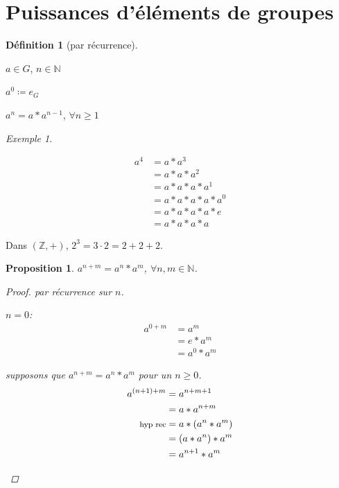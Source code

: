 \documentclass{report}
\newcommand*{\gte}{\geqslant}
\newcommand*{\entiers}{\mathbb{Z}}
\newcommand*{\naturels}{\mathbb{N}}
\newtheorem*{prop}{Proposition}
\theoremstyle{definition}
\newtheorem*{defin}{D\'efinition}
\theoremstyle{remark}
\newtheorem*{exem}{Exemple}
\begin{document}
	\section*{Puissances d'\'el\'ements de groupes}
	\begin{defin}[par r\'ecurrence]~

		$a \in G$, $n \in \naturels$
		\begin{nlist}
			\item $a^0 \coloneq e_G$
			\item $a^n=a*a^{n-1}$, $\forall n \gte 1$
		\end{nlist}
	\end{defin}
	\begin{exem}~

		\begin{ulist}
			\item \begin{align*}
				a^4&= a*a^3\\
				&= a*a*a^2\\
				&= a*a*a*a^1\\
				&= a*a*a*a*a^0\\
				&= a*a*a*a*e\\
				&= a*a*a*a
			\end{align*}
			\item Dans $(\entiers,+)$, $2^3=3 \cdot 2=2+2+2$.
		\end{ulist}
	\end{exem}
	\begin{prop}
		$a^{n+m}=a^n*a^m$, $\forall n,m \in \naturels$.
		\begin{proof}
			par r\'ecurrence sur $n$.

			\begin{nlist}
				\item $n=0$:
				\begin{align*}
					a^{0+m}&= a^m\\
					&= e*a^m\\
					&= a^0*a^m
				\end{align*}
				\item supposons que $a^{n+m}=a^n*a^m$ pour un $n \gte 0$.
				\begin{align*}
					a^{(n+1)+m}&= a^{n+m+1}\\
					&= a*a^{n+m}\\
					\text{\footnotesize hyp rec}&= a*(a^n*a^m)\\
					&= (a*a^n)*a^m\\
					&= a^{n+1}*a^m
				\end{align*}
			\end{nlist}
		\end{proof}
	\end{prop}
\end{document}

